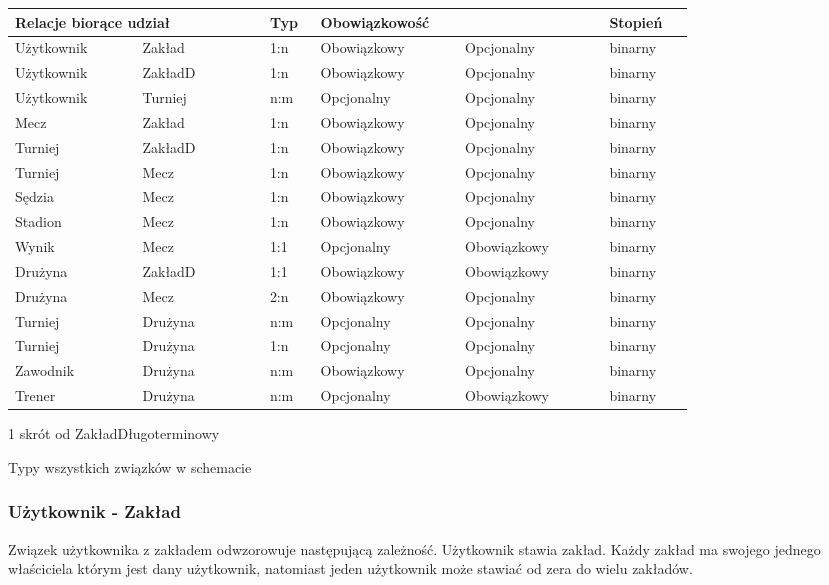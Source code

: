 \documentclass{mwrep}[15pt]
\begin{document}
\begin{threeparttable}[H]
	\begin{tabular}{|p{0.15\linewidth}|p{0.15\linewidth}|p{0.05\linewidth}|p{0.17\linewidth}|p{0.17\linewidth}|p{0.1\linewidth}|}
	\hline
	\multicolumn{2}{|p{0.3\linewidth}|}{Relacje biorące udział} & Typ & \multicolumn{2}{p{0.3\linewidth}|}{Obowiązkowość} & Stopień         \\ \hline
	Użytkownik & Zakład & 1:n & Obowiązkowy & Opcjonalny & binarny  \\ \hline
	Użytkownik & ZakładD\tnote{1} & 1:n & Obowiązkowy & Opcjonalny & binarny  \\ \hline
	Użytkownik & Turniej & n:m & Opcjonalny & Opcjonalny & binarny  \\ \hline
	Mecz & Zakład & 1:n & Obowiązkowy & Opcjonalny & binarny  \\ \hline
	Turniej & ZakładD\tnote{1} & 1:n & Obowiązkowy & Opcjonalny & binarny  \\ \hline
	Turniej & Mecz & 1:n & Obowiązkowy & Opcjonalny & binarny  \\ \hline
	Sędzia & Mecz & 1:n & Obowiązkowy & Opcjonalny & binarny  \\ \hline
	Stadion & Mecz & 1:n & Obowiązkowy & Opcjonalny & binarny  \\ \hline
	Wynik & Mecz & 1:1 & Opcjonalny & Obowiązkowy & binarny  \\ \hline
	Drużyna & ZakładD\tnote{1} & 1:1 & Obowiązkowy & Obowiązkowy & binarny \\ \hline
	Drużyna & Mecz & 2:n & Obowiązkowy & Opcjonalny & binarny  \\ \hline
	Turniej & Drużyna & n:m & Opcjonalny & Opcjonalny & binarny \\ \hline 
	Turniej & Drużyna & 1:n & Opcjonalny & Opcjonalny & binarny \\ \hline 
	Zawodnik & Drużyna & n:m & Obowiązkowy & Opcjonalny & binarny  \\ \hline
	Trener & Drużyna & n:m & Opcjonalny & Obowiązkowy & binarny  \\ \hline
	\end{tabular}
	\begin{tablenotes}
		\item [1] skrót od ZakładDługoterminowy
	\end{tablenotes}	
	\caption{Typy wszystkich związków w schemacie}
\end{threeparttable}

\subsubsection{Użytkownik - Zakład}
Związek użytkownika z zakładem odwzorowuje następującą zależność. Użytkownik stawia zakład. Każdy zakład ma swojego jednego właściciela którym jest dany użytkownik, natomiast jeden użytkownik może stawiać od zera do wielu zakładów.
\end{document}
